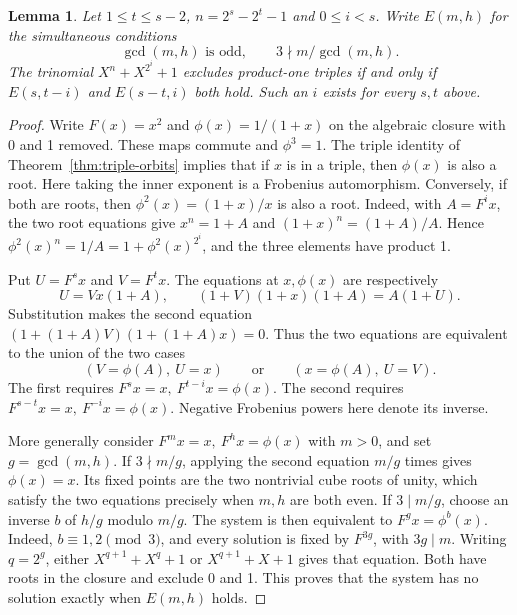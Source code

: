 \documentclass[11pt]{article}
\newtheorem{lemma}[theorem]{Lemma}
\begin{document}
\begin{lemma}\label{lem:signed-dyadic}
Let \(1\le t\le s-2\), \(n=2^s-2^t-1\) and \(0\le i<s\).
Write \(E(m,h)\) for the simultaneous conditions
\[
          \gcd(m,h)\text{ is odd},\qquad
          3\nmid m/\gcd(m,h).
\]
The trinomial \(X^n+X^{2^i}+1\) excludes product-one triples if and
only if \(E(s,t-i)\) and \(E(s-t,i)\) both hold. Such an \(i\)
exists for every \(s,t\) above.
\end{lemma}
\begin{proof}
Write \(F(x)=x^2\) and \(\phi(x)=1/(1+x)\) on the algebraic closure
with 0 and 1 removed. These maps commute and \(\phi^3=1\).
The triple identity of Theorem~\ref{thm:triple-orbits} implies that
if \(x\) is in a triple, then \(\phi(x)\) is also a root. Here taking
the inner exponent is a Frobenius automorphism. Conversely, if both
are roots, then \(\phi^2(x)=(1+x)/x\) is also a root. Indeed, with
\(A=F^i x\), the two root equations give
\(x^n=1+A\) and \((1+x)^n=(1+A)/A\). Hence
\(\phi^2(x)^n=1/A=1+\phi^2(x)^{2^i}\), and the three elements have
product 1.

Put \(U=F^s x\) and \(V=F^t x\). The equations at \(x,\phi(x)\)
are respectively
\[
 U=Vx(1+A),\qquad (1+V)(1+x)(1+A)=A(1+U).
\]
Substitution makes the second equation
\((1+(1+A)V)(1+(1+A)x)=0\).
Thus the two equations are equivalent to the union of the two cases
\[
 (V=\phi(A),\ U=x)\qquad\text{or}\qquad (x=\phi(A),\ U=V).
\]
The first requires \(F^s x=x,\ F^{t-i}x=\phi(x)\).
The second requires \(F^{s-t}x=x,\ F^{-i}x=\phi(x)\).
Negative Frobenius powers here denote its inverse.

More generally consider \(F^m x=x,\ F^h x=\phi(x)\) with
\(m>0\), and set \(g=\gcd(m,h)\). If \(3\nmid m/g\), applying the
second equation \(m/g\) times gives \(\phi(x)=x\).
Its fixed points are the two nontrivial cube roots of unity,
which satisfy the two equations precisely when \(m,h\) are both even.
If \(3\mid m/g\), choose an inverse \(b\) of \(h/g\) modulo \(m/g\).
The system is then equivalent to \(F^g x=\phi^b(x)\).
Indeed, \(b\equiv1,2\pmod3\), and every solution is fixed by
\(F^{3g}\), with \(3g\mid m\). Writing \(q=2^g\), either
\(X^{q+1}+X^q+1\) or \(X^{q+1}+X+1\) gives that equation.
Both have roots in the closure and exclude 0 and 1. This proves that
the system has no solution exactly when \(E(m,h)\) holds.


\end{proof}
\end{document}

